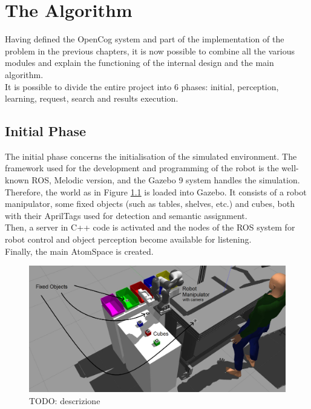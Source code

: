 
\chapter{The Algorithm} \label{cha:algorithm}

Having defined the OpenCog system and part of the implementation of the problem in the previous chapters, it is now possible to combine all the various modules and explain the functioning of the internal design and the main algorithm. \\

It is possible to divide the entire project into 6 phases: initial, perception, learning, request, search and results execution.  

\section{Initial Phase}\label{sec:init}

The initial phase concerns the initialisation of the simulated environment. The framework used for the development and programming of the robot is the well-known ROS, Melodic version, and the Gazebo 9 system handles the simulation. \\
Therefore, the world as in Figure \ref{fig:env_2_named} is loaded into Gazebo. 
It consists of a robot manipulator, some fixed objects  (such as tables, shelves, etc.) and cubes, both with their AprilTags used for detection and semantic assignment. \\
Then, a server in C++ code is activated and the nodes of the ROS system for robot control and object perception become available for listening. \\
Finally, the main AtomSpace is created. 

\begin{figure} [h]
\centering
\includegraphics[width=0.9
\textwidth]{figures/Magistrale/env_2_named}
\caption[Environment Components]{ TODO: descrizione
\label{fig:env_2_named}}
\end{figure} 

